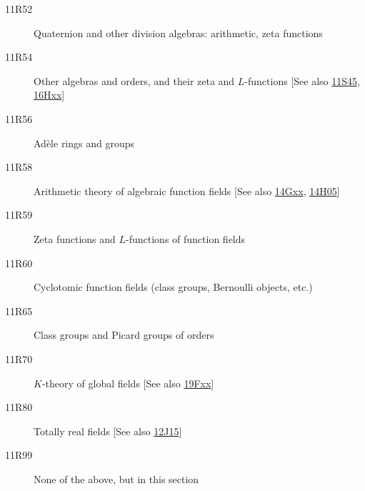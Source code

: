 \begin{description}
\item [11R52]\label{11R52} Quaternion and other division algebras: arithmetic, zeta functions
\item [11R54]\label{11R54} Other algebras and orders, and their zeta and $L$-functions [See also \hyperref[11S45]{11S45}, \hyperref[16Hxx]{16Hxx}]
\item [11R56]\label{11R56} Ad\`{e}le rings and groups
\item [11R58]\label{11R58} Arithmetic theory of algebraic function fields [See also \hyperref[14Gxx]{14Gxx}, \hyperref[14H05]{14H05}]
\item [11R59]\label{11R59} Zeta functions and $L$-functions of function fields
\item [11R60]\label{11R60} Cyclotomic function fields (class groups, Bernoulli objects, etc.)
\item [11R65]\label{11R65} Class groups and Picard groups of orders
\item [11R70]\label{11R70} $K$-theory of global fields [See also \hyperref[19Fxx]{19Fxx}]
\item [11R80]\label{11R80} Totally real fields [See also \hyperref[12J15]{12J15}]
\item [11R99]\label{11R99} None of the above, but in this section
\end{description}
